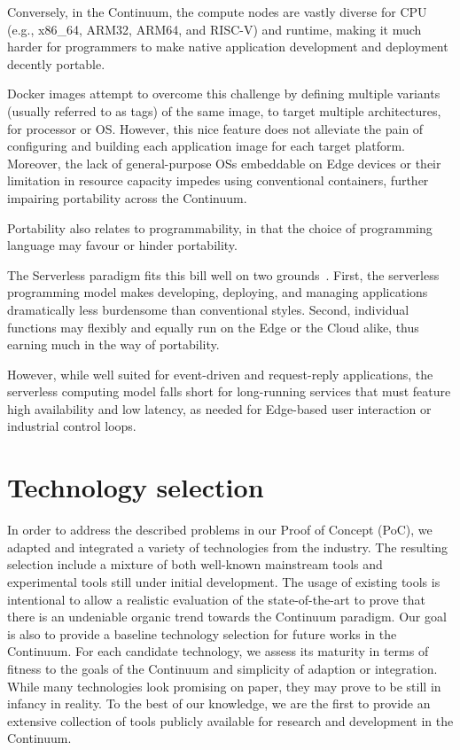 Conversely, in the Continuum, the compute nodes are vastly diverse for CPU (e.g., x86\_64, ARM32, ARM64, and RISC-V) and runtime, making it much harder for programmers to make native application development and deployment decently portable. 

Docker images attempt to overcome this challenge by defining multiple variants (usually referred to as tags) of the same image, to target multiple architectures, for processor or OS. 
However, this nice feature does not alleviate the pain of configuring and building each application image for each target platform. Moreover, the lack of general-purpose OSs embeddable on Edge devices or their limitation in resource capacity impedes using conventional containers, further impairing portability across the Continuum.

Portability also relates to programmability, in that the choice of programming language may favour or hinder portability. 

The Serverless paradigm fits this bill well on two grounds~\cite{yi2017lavea}. First, the serverless programming model makes developing, deploying, and managing applications dramatically less burdensome than conventional styles.
Second, individual functions may flexibly and equally run on the Edge or the Cloud alike, thus earning much in the way of portability.

However, while well suited for event-driven and request-reply applications, the serverless computing model falls short for long-running services that must feature high availability and low latency, as needed for Edge-based user interaction or industrial control loops.

\section{Technology selection}

In order to address the described problems in our Proof of Concept (PoC), we adapted and integrated a variety of technologies from the industry. The resulting selection include a mixture of both well-known mainstream tools and experimental tools still under initial development. The usage of existing tools is intentional to allow a realistic evaluation of the state-of-the-art to prove that there is an undeniable organic trend towards the Continuum paradigm. Our goal is also to provide a baseline technology selection for future works in the Continuum. For each candidate technology, we assess its maturity in terms of fitness to the goals of the Continuum and simplicity of adaption or integration. While many technologies look promising on paper, they may prove to be still in infancy in reality. To the best of our knowledge, we are the first to provide an extensive collection of tools publicly available for research and development in the Continuum.

